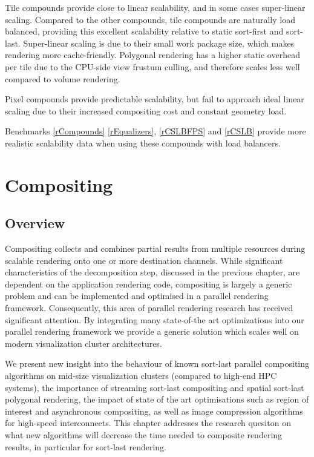 Tile compounds provide close to linear scalability, and in some cases
super-linear scaling. Compared to the other compounds, tile compounds are
naturally load balanced, providing this excellent scalability relative to
static sort-first and sort-last. Super-linear scaling is due to their small
work package size, which makes rendering more cache-friendly. Polygonal
rendering has a higher static overhead per tile due to the CPU-side view
frustum culling, and therefore scales less well compared to volume rendering.

Pixel compounds provide predictable scalability, but fail to approach ideal
linear scaling due to their increased compositing cost and constant geometry
load.

Benchmarks \ref{rCompounds} \ref{rEqualizers}, \ref{rCSLBFPS} and \ref{rCSLB}
provide more realistic scalability data when using these compounds with load
balancers.

\chapter{Compositing}\label{sCompositing}

\section{Overview}

Compositing collects and combines partial results from multiple resources
during scalable rendering onto one or more destination channels. While
significant characteristics of the decomposition step, discussed in the
previous chapter, are dependent on the application rendering code, compositing
is largely a generic problem and can be implemented and optimised in a parallel
rendering framework. Consequently, this area of parallel rendering research has
received significant attention. By integrating many state-of-the art
optimizations into our parallel rendering framework we provide a generic
solution which scales well on modern visualization cluster architectures.

We present new insight into the behaviour of known sort-last parallel compositing algorithms on mid-size visualization clusters (compared to high-end HPC systems), the importance of streaming sort-last compositing and spatial sort-last polygonal rendering, the impact of state of the art optimisations such as region of interest and asynchronous compositing, as well as image compression algorithms for high-speed interconnects. This chapter addresses the research quesiton on what new algorithms will decrease the time needed to composite rendering results, in particular for sort-last rendering.

